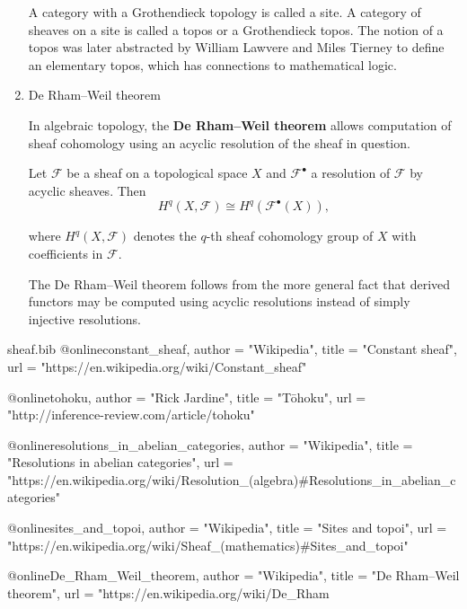 \documentclass[UTF8]{ctexart}
\begin{document}
\begin{enumerate}
A category with a Grothendieck topology is called a site. A category of sheaves on a site is called a topos or a Grothendieck topos. The notion of a topos was later abstracted by William Lawvere and Miles Tierney to define an elementary topos, which has connections to mathematical logic.

\item De Rham–Weil theorem\parencite{De_Rham_Weil_theorem}

In algebraic topology, the \textbf{De Rham–Weil theorem} allows computation of sheaf cohomology using an acyclic resolution of the sheaf in question.

Let $\mathcal{F}$ be a sheaf on a topological space $X$ and $\mathcal{F}^{\bullet}$ a resolution of $\mathcal{F}$ by acyclic sheaves. Then
\[
H^{q}(X,{\mathcal{F}})\cong H^{q}({\mathcal{F}}^{\bullet}(X)),
\]

where $H^{q}(X,{\mathcal {F}})$ denotes the $q$-th sheaf cohomology group of $X$ with coefficients in $\mathcal{F}$.

The De Rham–Weil theorem follows from the more general fact that derived functors may be computed using acyclic resolutions instead of simply injective resolutions.

\end{enumerate}

\begin{filecontents*}{sheaf.bib}
@online{constant_sheaf,
author = "Wikipedia",
title = "Constant sheaf",
url = "https://en.wikipedia.org/wiki/Constant_sheaf"
}

@online{tohoku,
author = "Rick Jardine",
title = "Tōhoku",
url = "http://inference-review.com/article/tohoku"
}

@online{resolutions_in_abelian_categories,
author = "Wikipedia",
title = "Resolutions in abelian categories",
url = "https://en.wikipedia.org/wiki/Resolution_(algebra)#Resolutions_in_abelian_categories"
}

@online{sites_and_topoi,
author = "Wikipedia",
title = "Sites and topoi",
url = "https://en.wikipedia.org/wiki/Sheaf_(mathematics)#Sites_and_topoi"
}

@online{De_Rham_Weil_theorem,
author = "Wikipedia",
title = "De Rham–Weil theorem",
url = "https://en.wikipedia.org/wiki/De_Rham%
}
\end{filecontents*}

\newpage
\printbibliography
\end{document}
